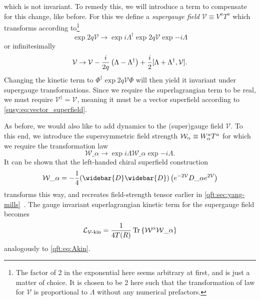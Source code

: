 \documentclass[../main.tex]{subfiles}
\begin{document}
which is not invariant.
To remedy this, we will introduce a term to compensate for this change, like before.
For this we define a   \emph{supergauge field} \(\mathcal{V} \equiv V^a T^a\) which transforms according to\footnote{The factor of 2 in the exponential here seems arbitrary at first, and is just a matter of choice. It is chosen to be 2 here such that the transformation of law for \(\mathcal{V}\) is proportional to \(\Lambda\) without any numerical prefactors.}
\begin{equation}
  \exp{2q\mathcal{V}} \to \exp{i\Lambda^\dagger} \exp{2q\mathcal{V}} \exp{-i\Lambda}
\end{equation}
or infinitesimally
\begin{equation}
  \mathcal{V} \to \mathcal{V} - \frac{i}{2q} \left(\Lambda - \Lambda^\dagger\right) + \frac{i}{2} [\Lambda + \Lambda^\dagger,\mathcal{V}].
\end{equation}
Changing the kinetic term to \(\Phi^\dagger \exp{2q\mathcal{V}} \Phi\) will then yield it invariant under supergauge transformations.
Since we require the superlagrangian term to be real, we must require \(\mathcal{V}^\dagger = \mathcal{V}\), meaning it must be a vector superfield according to \cref{susy:eq:vector_superfield}.

As before, we would also like to add dynamics to the (super)gauge field \(\mathcal{V}\).
To this end, we introduce the supersymmetric field strength \(\mathcal{W}_\alpha \equiv W\indices*{^a_\alpha} T^a\) for which we require the transformation law
\begin{equation}
  \mathcal{W}\_\alpha \to \exp{i\Lambda} \mathcal{W}\_\alpha \exp{-i\Lambda}.
\end{equation}
It can be shown that the left-handed chiral superfield construction
\begin{equation}
  \label{susy:eq:superfield_strength}
  \mathcal{W}\_\alpha = -\frac{1}{4} (\widebar{D}\widebar{D}) \pclosed{\exp{-2\mathcal{V}} D\_\alpha \exp{2\mathcal{V}}}
\end{equation}
transforms this way, and recreates field-strength tensor earlier in \cref{qft:sec:yang-mills}~\cite{Martin:1997ns}.
The gauge invariant superlagrangian kinetic term for the supergauge field becomes
\begin{equation}
  \label{susy:eq:Vkin}
  \L_{\mathcal{V}\text{-kin}} = \frac{1}{4 T(R)} \tr\cclosed{ \mathcal{W}\^\alpha \mathcal{W}\_\alpha }
\end{equation}
analogously to \cref{qft:eq:Akin}.
\end{document}

